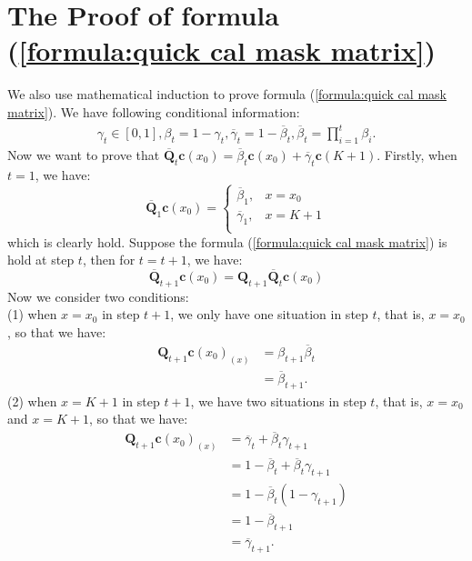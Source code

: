 \documentclass[lettersize,journal]{IEEEtran}
\begin{document}
\section{The Proof of formula (\ref{formula:quick cal mask matrix})} \label{appendix2}
We also use mathematical induction to prove formula (\ref{formula:quick cal mask matrix}). We have following conditional information:
\begin{equation}\label{formula:proof4}
\begin{aligned}
   \gamma_t \in [0,1], \beta_t=1-\gamma_t ,
   \overline{\gamma}_t= 1- \overline{\beta}_t, \overline{\beta}_t=\prod_{i=1}^{t} \beta_i.
\end{aligned}
\end{equation}
Now we want to prove that $\overline{\boldsymbol{Q}}_t \boldsymbol{c}(x_0) = \overline{\beta}_t \boldsymbol{c}(x_0) + \overline{\gamma}_t\boldsymbol{c}(K+1)$.
Firstly, when $t=1$, we have:
\begin{equation}\label{formula:proof5}
\overline{\boldsymbol{Q}}_1\boldsymbol{c}(x_0)=
\left\{
             \begin{array}{lr}
             \overline{\beta}_1, & x=x_0  \\
             \overline{\gamma}_1, & x = K+1\\
             \end{array}
\right.
\end{equation}
which is clearly hold. Suppose the formula (\ref{formula:quick cal mask matrix}) is hold at step $t$, then for $t = t + 1$, we have:
$$
\overline{\boldsymbol{Q}}_{t+1} \boldsymbol{c}(x_0) = \boldsymbol{Q}_{t+1}\overline{\boldsymbol{Q}}_t \boldsymbol{c}(x_0)
$$
Now we consider two conditions: \\
(1) when $x=x_0$ in step $t+1$, we only have one situation in step $t$, that is, $x=x_0$, so that we have:
\begin{equation}\label{formula:proof6}
\begin{aligned}
  \boldsymbol{Q}_{t+1}\boldsymbol{c}(x_0)_{(x)}&=\beta_{t+1}\overline{\beta}_t \\
  &= \overline{\beta}_{t+1}.
\end{aligned}
\end{equation}
(2) when $x = K+1$ in step $t+1$, we have two situations in step $t$, that is, $x=x_0$ and $x = K+1$, so that we have:
\begin{equation}\label{formula:proof7}
\begin{aligned}
  \boldsymbol{Q}_{t+1}\boldsymbol{c}(x_0)_{(x)}&=\overline{\gamma}_t + \overline{\beta}_t\gamma_{t+1} \\
  &= 1-\overline{\beta}_t + \overline{\beta}_t\gamma_{t+1} \\
  &= 1-\overline{\beta}_t(1-\gamma_{t+1}) \\
  &= 1-\overline{\beta}_{t+1} \\
  &= \overline{\gamma}_{t+1}.
\end{aligned}
\end{equation}
\end{document}
